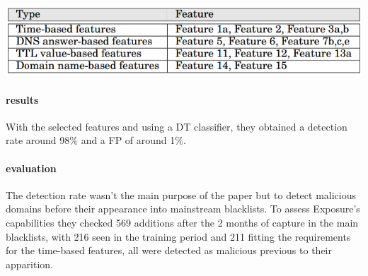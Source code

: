 \includegraphics[scale=.5]{img/exposure_ga.png}

\paragraph{results}
With the selected features and using a DT classifier, they obtained a detection rate around 98\% and a FP of around 1\%. 
\paragraph{evaluation}
The detection rate wasn't the main purpose of the paper but to detect malicious domains before their appearance into mainstream blacklists. To assess Exposure's capabilities they checked 569 additions after the 2 months of capture in the main blacklists, with 216 seen in the training period and 211 fitting the requirements for the time-based features, all were detected as malicious previous to their apparition.


